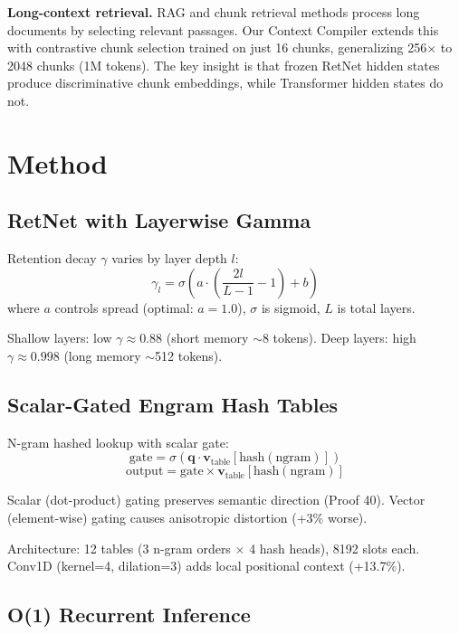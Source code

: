\documentclass[twocolumn]{article}
\begin{document}
\textbf{Long-context retrieval.} RAG and chunk retrieval methods process long documents by selecting relevant passages. Our Context Compiler extends this with contrastive chunk selection trained on just 16 chunks, generalizing 256$\times$ to 2048 chunks (1M tokens). The key insight is that frozen RetNet hidden states produce discriminative chunk embeddings, while Transformer hidden states do not.

\section{Method}

\subsection{RetNet with Layerwise Gamma}

Retention decay $\gamma$ varies by layer depth $l$:
\begin{equation}
\gamma_l = \sigma\left(a \cdot \left(\frac{2l}{L-1} - 1\right) + b\right)
\end{equation}
where $a$ controls spread (optimal: $a=1.0$), $\sigma$ is sigmoid, $L$ is total layers.

Shallow layers: low $\gamma \approx 0.88$ (short memory $\sim$8 tokens).
Deep layers: high $\gamma \approx 0.998$ (long memory $\sim$512 tokens).

\subsection{Scalar-Gated Engram Hash Tables}

N-gram hashed lookup with scalar gate:
\begin{equation}
\text{gate} = \sigma(\mathbf{q} \cdot \mathbf{v}_{\text{table}}[\text{hash}(\text{ngram})])
\end{equation}
\begin{equation}
\text{output} = \text{gate} \times \mathbf{v}_{\text{table}}[\text{hash}(\text{ngram})]
\end{equation}

Scalar (dot-product) gating preserves semantic direction (Proof 40).
Vector (element-wise) gating causes anisotropic distortion (+3\% worse).

Architecture: 12 tables (3 n-gram orders $\times$ 4 hash heads), 8192 slots each.
Conv1D (kernel=4, dilation=3) adds local positional context (+13.7\%).

\subsection{O(1) Recurrent Inference}
\end{document}
